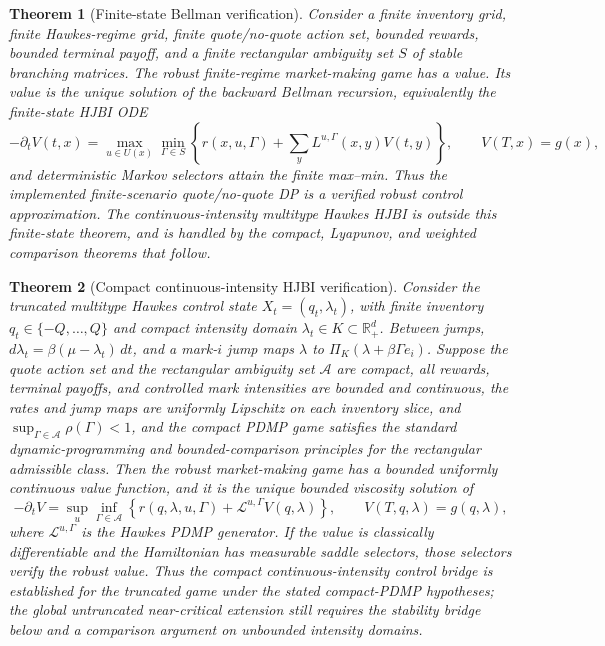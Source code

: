 \documentclass[review]{siamonline250211}
\newtheorem{theorem}{Theorem}
\newcommand{\R}{\mathbb{R}}
\begin{document}
\begin{theorem}[Finite-state Bellman verification]
Consider a finite inventory grid, finite Hawkes-regime grid, finite
quote/no-quote action set, bounded rewards, bounded terminal payoff, and a
finite rectangular ambiguity set $S$ of stable branching matrices. The robust
finite-regime market-making game has a value. Its value is the unique solution
of the backward Bellman recursion, equivalently the finite-state HJBI ODE
\[
-\partial_t V(t,x)=
\max_{u\in U(x)}\min_{\Gamma\in S}
\left\{r(x,u,\Gamma)+\sum_y L^{u,\Gamma}(x,y)V(t,y)\right\},
\qquad V(T,x)=g(x),
\]
and deterministic Markov selectors attain the finite max--min. Thus the
implemented finite-scenario quote/no-quote DP is a verified robust control
approximation. The continuous-intensity multitype Hawkes HJBI is outside this
finite-state theorem, and is handled by the compact, Lyapunov, and weighted
comparison theorems that follow.
\end{theorem}

\begin{theorem}[Compact continuous-intensity HJBI verification]
Consider the truncated multitype Hawkes control state
$X_t=(q_t,\lambda_t)$, with finite inventory
$q_t\in\{-Q,\ldots,Q\}$ and compact intensity domain
$\lambda_t\in K\subset\R_+^d$. Between jumps,
$d\lambda_t=\beta(\mu-\lambda_t)\,dt$, and a mark-$i$ jump maps
$\lambda$ to $\Pi_K(\lambda+\beta\Gamma e_i)$. Suppose the quote action set
and the rectangular ambiguity set $\mathcal A$ are compact, all rewards,
terminal payoffs, and controlled mark intensities are bounded and continuous,
the rates and jump maps are uniformly Lipschitz on each inventory slice, and
$\sup_{\Gamma\in\mathcal A}\rho(\Gamma)<1$, and the compact PDMP game satisfies
the standard dynamic-programming and bounded-comparison principles for the
rectangular admissible class. Then the robust market-making game has a bounded
uniformly continuous value function, and it is the unique bounded viscosity
solution of
\[
-\partial_t V=
\sup_{u}\inf_{\Gamma\in\mathcal A}
\left\{
r(q,\lambda,u,\Gamma)+\mathcal L^{u,\Gamma}V(q,\lambda)
\right\},\qquad
V(T,q,\lambda)=g(q,\lambda),
\]
where $\mathcal L^{u,\Gamma}$ is the Hawkes PDMP generator. If the value is
classically differentiable and the Hamiltonian has measurable saddle
selectors, those selectors verify the robust value. Thus the compact
continuous-intensity control bridge is established for the truncated game under
the stated compact-PDMP hypotheses; the global untruncated near-critical
extension still requires the stability bridge below and a comparison argument
on unbounded intensity domains.
\end{theorem}
\end{document}
